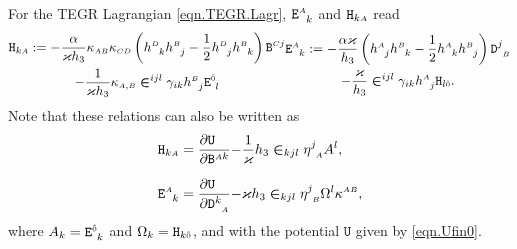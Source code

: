 \documentclass[
10pt, %
a4paper, %
oneside, %
twocolumn,
headinclude,footinclude, %
BCOR5mm, %
]{scrartcl}
\newcommand{\sA}{\mathsmaller A}
\newcommand{\sB}{\mathsmaller B}
\newcommand{\sC}{\mathsmaller C}
\newcommand{\sD}{\mathsmaller D}
\newcommand{\pd}[1]{\partial_{#1}}
\newcommand{\mg}[1]{\kappa_{#1}}			%
\newcommand{\MG}[1]{\kappa^{#1}}			%
\newcommand{\tetrsymbol}{h}
\newcommand{\itetrsymbol}{\eta}
\newcommand{\itetr}[2]{\itetrsymbol^{#1}_{\phantom{#1}#2}}
\newcommand{\tetr}[2]{\tetrsymbol^{#1}_{\phantom{#1}#2}}
\newcommand{\detTetr}{\tetrsymbol}
\newcommand{\Dfin}[2]{\mathtt{D}_{\phantom{#2}#1}^{#2}}	%
\newcommand{\Hfin}[2]{\mathtt{H}_{#2#1}}	%
\newcommand{\Efin}[2]{\mathtt{E}^{#1}_{\phantom{#1}#2}}	%
\newcommand{\Ufin}{\mathtt{U}}
\newcommand{\Bfin}[2]{\mathtt{B}^{#1#2}}	%
\newcommand{\LCsymb}{\bm{\in}}    %
\newcommand{\indalg}[1]{\hat{\mathsmaller{#1}}}
\begin{document}
	For the TEGR Lagrangian \eqref{eqn.TEGR.Lagr}, $ \Efin{\sA}{k} $ and $ \Hfin{\sA}{k} $ read
	\begin{subequations}\label{eqn.H.E}
		\begin{multline}
			\Hfin{\sA}{k} := %
			-\frac{\alpha}{\varkappa \detTetr_3} 
			\mg{\sA\sB}\mg{\sC\sD} 
			\left( \tetr{\sD}{k} \tetr{\sB}{j}
			- \frac12 \tetr{\sD}{j} \tetr{\sB}{k} \right) 
			\Bfin{\sC}{j}
			\\
			- 
					\frac{1}{\varkappa \detTetr_3} \mg{\sA,\sB} \LCsymb^{ijl} \gamma_{ik} 
			\tetr{\sB}{j} 
					\Efin{\indalg{0}}{l}
		\end{multline}
		\begin{multline}
			\Efin{\sA}{k} := %
			-\frac{\alpha \varkappa}{\detTetr_3} 
			\left( \tetr{\sA}{j} \tetr{\sB}{k} - \frac12 \tetr{\sA}{k} \tetr{\sB}{j} \right) 
			\Dfin{\sB}{j} 
			\\
			- 
					\frac{\varkappa}{\detTetr_3} \LCsymb^{ijl} 
					\gamma_{ik} \tetr{\sA}{j} \Hfin{\indalg{0}}{l}.
			\label{eqn.E}
		\end{multline}
	\end{subequations}
	Note that these relations can also be written as
	\begin{align}\label{eqn.H.E.split}
		\Hfin{\sA}{k} &= %
		\frac{\pd{}\Ufin\hfill}{\pd{}\Bfin{\sA}{k}}
		{ 
			-
			\frac{1}{\varkappa}\detTetr_3 \LCsymb_{kjl} \itetr{j}{\sA} A^l},
		\\[2mm]
		\Efin{\sA}{k} &= %
		\frac{\pd{}\Ufin\hfill}{\pd{}\Dfin{\sA}{k}}
		{
			-
			\varkappa \detTetr_3 \LCsymb_{kjl} 
			\itetr{j}{\sB} \Omega^l}\MG{\sA\sB},
	\end{align}
	where $ A_k = \Efin{\indalg{0}}{k} $ and $ \Omega_k =\Hfin{\indalg{0}}{k}$, and with the potential $ \Ufin $ given by \eqref{eqn.Ufin0}.
	
\end{document}
